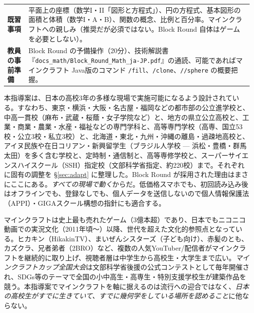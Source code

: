 \documentclass[12pt,a4paper]{scrartcl}
\newcommand{\cmd}[1]{\textcolor{earth}{\texttt{\small #1}}}
\begin{document}
\begin{center}
\begin{tabular}{@{}p{}p{}@{}}
\addlinespace[2pt]
\textbf{既習事項} & 平面上の座標（数学I・II「図形と方程式」）、円の方程式、基本図形の面積と体積（数学I・A・B）、関数の概念、比例と百分率。マインクラフトへの親しみ（推奨だが必須ではない。Block Round 自体はゲームを必要としない）。 \\
\addlinespace[2pt]
\textbf{教員の事前準備} & Block Round の予備操作（20分）、技術解説書『\texttt{docs\_math/Block\_Round\_Math\_ja-JP.pdf}』の通読、可能であればマインクラフト Java版のコマンド \cmd{/fill}、\cmd{/clone}、\cmd{//sphere} の概要把握。 \\
\bottomrule
\end{tabular}
\end{center}

\begin{memo}[日本の高校の多様性に対応する設計]
本指導案は、日本の高校3年の多様な現場で実施可能になるよう設計されている。すなわち、東京・横浜・大阪・名古屋・福岡などの都市部の公立進学校と、中高一貫校（麻布・武蔵・桜蔭・女子学院など）と、地方の県立公立高校と、工業・商業・農業・水産・福祉などの専門学科と、高等専門学校（高専、国立53校・公立3校・私立3校）と、北海道・東北・九州・沖縄の離島・過疎地高校と、アイヌ民族や在日コリアン・新興留学生（ブラジル人学校 — 浜松・豊橋・群馬太田）を多く含む学校と、定時制・通信制と、高等専修学校と、スーパーサイエンスハイスクール（SSH）指定校（文部科学省指定、約220校）まで。それぞれに固有の調整を §\ref{sec:adapt} に整理した。Block Round が採用された理由はまさにここにある。\emph{すべての現場で動く}からだ。低価格スマホでも、初回読み込み後はオフラインでも、登録なしでも、個人データを送信しないので個人情報保護法（APPI）・GIGAスクール構想の指針にも適合する。
\end{memo}

\begin{minecraft}[本指導案がマインクラフトを軸とする理由]
マインクラフトは史上最も売れたゲーム（3億本超）であり、日本でもニコニコ動画での実況文化（2011年頃〜）以降、世代を超えた文化的参照点となっている。ヒカキン（HikakinTV）、まいぜんシスターズ（子ども向け）、赤髪のとも、カズクラ、兄者弟者（2BRO）など、複数の人気YouTuber/配信者がマインクラフトを継続的に取り上げ、視聴者層は中学生から高校生・大学生まで広い。\emph{マインクラフトカップ全国大会}は文部科学省後援の公式コンテストとして毎年開催され、SDGs等のテーマで全国の小中高生・高専生・特別支援学校生が建築作品を競う。本指導案でマインクラフトを軸に据えるのは流行への迎合ではなく、\emph{日本の高校生がすでに生きていて、すでに幾何学をしている場所を認めること}に他ならない。
\end{minecraft}
\end{document}
